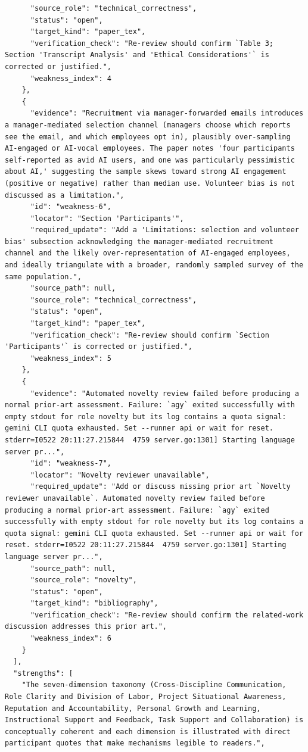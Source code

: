 \documentclass[11pt]{article}
\begin{document}
\begin{verbatim}
      "source_role": "technical_correctness",
      "status": "open",
      "target_kind": "paper_tex",
      "verification_check": "Re-review should confirm `Table 3; Section 'Transcript Analysis' and 'Ethical Considerations'` is corrected or justified.",
      "weakness_index": 4
    },
    {
      "evidence": "Recruitment via manager-forwarded emails introduces a manager-mediated selection channel (managers choose which reports see the email, and which employees opt in), plausibly over-sampling AI-engaged or AI-vocal employees. The paper notes 'four participants self-reported as avid AI users, and one was particularly pessimistic about AI,' suggesting the sample skews toward strong AI engagement (positive or negative) rather than median use. Volunteer bias is not discussed as a limitation.",
      "id": "weakness-6",
      "locator": "Section 'Participants'",
      "required_update": "Add a 'Limitations: selection and volunteer bias' subsection acknowledging the manager-mediated recruitment channel and the likely over-representation of AI-engaged employees, and ideally triangulate with a broader, randomly sampled survey of the same population.",
      "source_path": null,
      "source_role": "technical_correctness",
      "status": "open",
      "target_kind": "paper_tex",
      "verification_check": "Re-review should confirm `Section 'Participants'` is corrected or justified.",
      "weakness_index": 5
    },
    {
      "evidence": "Automated novelty review failed before producing a normal prior-art assessment. Failure: `agy` exited successfully with empty stdout for role novelty but its log contains a quota signal: gemini CLI quota exhausted. Set --runner api or wait for reset. stderr=I0522 20:11:27.215844  4759 server.go:1301] Starting language server pr...",
      "id": "weakness-7",
      "locator": "Novelty reviewer unavailable",
      "required_update": "Add or discuss missing prior art `Novelty reviewer unavailable`. Automated novelty review failed before producing a normal prior-art assessment. Failure: `agy` exited successfully with empty stdout for role novelty but its log contains a quota signal: gemini CLI quota exhausted. Set --runner api or wait for reset. stderr=I0522 20:11:27.215844  4759 server.go:1301] Starting language server pr...",
      "source_path": null,
      "source_role": "novelty",
      "status": "open",
      "target_kind": "bibliography",
      "verification_check": "Re-review should confirm the related-work discussion addresses this prior art.",
      "weakness_index": 6
    }
  ],
  "strengths": [
    "The seven-dimension taxonomy (Cross-Discipline Communication, Role Clarity and Division of Labor, Project Situational Awareness, Reputation and Accountability, Personal Growth and Learning, Instructional Support and Feedback, Task Support and Collaboration) is conceptually coherent and each dimension is illustrated with direct participant quotes that make mechanisms legible to readers.",

\end{verbatim}
\end{document}
